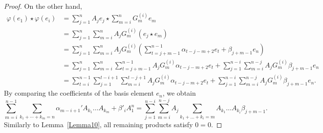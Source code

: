 \documentclass{jonasart}
\begin{document}
\begin{proof}
		On the other hand,
        \begin{align*}
            \varphi(e_1 ) \star \varphi(e_i )
            &= \sum_{j=1}^n A_j e_j \star \sum_{m=i}^n G_m^{(i)} e_m \\
            &= \sum_{j=1}^n \sum_{m=i}^n A_j G_m^{(i)} (e_j \star e_m ) \\
            &= \sum_{j=1}^n \sum_{m=i}^n A_j G_m^{(i)} \left( \sum_{t=j+m-1}^{n-1} \alpha_{t-j-m+2} e_t + \beta_{j+m-1}e_n \right) \\
            &= \sum_{j=1}^n \sum_{m=i}^n \sum_{t=j+m-1}^{n-1} A_j G_m^{(i)} \alpha_{t-j-m+2} e_t + \sum_{j=1}^{n-i} \sum_{m=i}^{n-j} A_j G_m^{(i)} \beta_{j+m-1}e_n \\
            &= \sum_{t=i}^{n-1} \sum_{j=1}^{t-i+1} \sum_{m=i}^{t-j+1} A_j G_m^{(i)} \alpha_{t-j-m+2} e_t + \sum_{j=1}^{n-i} \sum_{m=i}^{n-j} A_j G_m^{(i)} \beta_{j+m-1}e_n.
        \end{align*}
		By comparing the coefficients of the basis element $e_n$, we obtain
		\[
			\sum_{m=i}^{n-1} \sum_{k_1 +\cdots+k_m =n} \alpha_{m-i+1}' A_{k_1} \dots A_{k_m} +\beta'_{i} A_1^n = \sum_{j=1}^{n-i} \sum_{m=i}^{n-j} A_j \sum_{k_1 + \dots +k_i =m} A_{k_1} \dots A_{k_i} \beta_{j+m-1}.
		\]
		Similarly to Lemma~\ref{Lemma10}, all remaining products satisfy
		$0 = 0.$
	\end{proof}
\end{document}

